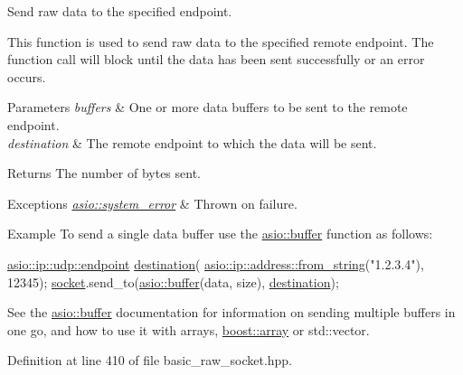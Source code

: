 Send raw data to the specified endpoint. 

This function is used to send raw data to the specified remote endpoint. The function call will block until the data has been sent successfully or an error occurs.


\begin{DoxyParams}{Parameters}
{\em buffers} & One or more data buffers to be sent to the remote endpoint.\\
\hline
{\em destination} & The remote endpoint to which the data will be sent.\\
\hline
\end{DoxyParams}
\begin{DoxyReturn}{Returns}
The number of bytes sent.
\end{DoxyReturn}

\begin{DoxyExceptions}{Exceptions}
{\em \hyperlink{classasio_1_1system__error}{asio\+::system\+\_\+error}} & Thrown on failure.\\
\hline
\end{DoxyExceptions}
\begin{DoxyParagraph}{Example}
To send a single data buffer use the \hyperlink{group__buffer}{asio\+::buffer} function as follows\+: 
\begin{DoxyCode}
\hyperlink{classasio_1_1ip_1_1basic__endpoint}{asio::ip::udp::endpoint} \hyperlink{classasio_1_1basic__raw__socket_ad4085e3f776b88e9f818fd8f34295ecb}{destination}(
    \hyperlink{classasio_1_1ip_1_1address_a243a3c877143eff5cdf97a6b021febec}{asio::ip::address::from\_string}(\textcolor{stringliteral}{"1.2.3.4"}), 12345);
\hyperlink{namespacewebsocketpp_1_1transport_1_1asio_1_1socket_1_1error_a828ddaa5ed63a761e1b557465a35f05aa0c31b356014843e1d09514e794a539a7}{socket}.send\_to(\hyperlink{group__buffer_ga1ed66e401559cbfd19595392f653b47c}{asio::buffer}(data, size), \hyperlink{classasio_1_1basic__raw__socket_ad4085e3f776b88e9f818fd8f34295ecb}{destination});
\end{DoxyCode}
 See the \hyperlink{group__buffer}{asio\+::buffer} documentation for information on sending multiple buffers in one go, and how to use it with arrays, \hyperlink{classboost_1_1array}{boost\+::array} or std\+::vector. 
\end{DoxyParagraph}


Definition at line 410 of file basic\+\_\+raw\+\_\+socket.\+hpp.

\hypertarget{classasio_1_1basic__raw__socket_a294142d105ec0306f52113aa45d11ee3}{}
